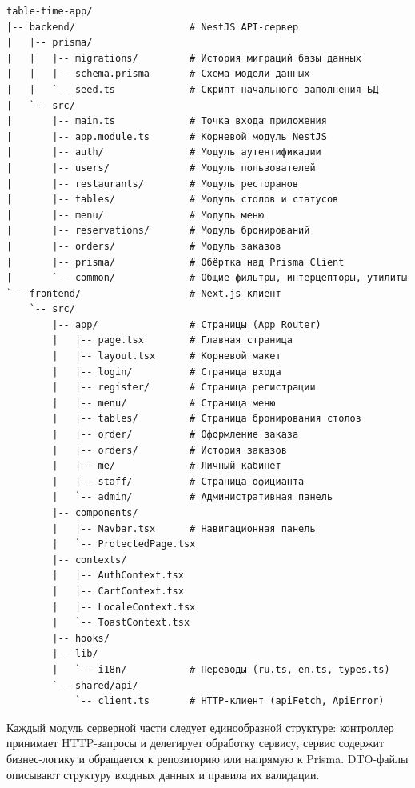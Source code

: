 \begin{lstlisting}[caption={Структура монорепозитория},
                   label=lst:dirtree]
table-time-app/
|-- backend/                    # NestJS API-сервер
|   |-- prisma/
|   |   |-- migrations/         # История миграций базы данных
|   |   |-- schema.prisma       # Схема модели данных
|   |   `-- seed.ts             # Скрипт начального заполнения БД
|   `-- src/
|       |-- main.ts             # Точка входа приложения
|       |-- app.module.ts       # Корневой модуль NestJS
|       |-- auth/               # Модуль аутентификации
|       |-- users/              # Модуль пользователей
|       |-- restaurants/        # Модуль ресторанов
|       |-- tables/             # Модуль столов и статусов
|       |-- menu/               # Модуль меню
|       |-- reservations/       # Модуль бронирований
|       |-- orders/             # Модуль заказов
|       |-- prisma/             # Обёртка над Prisma Client
|       `-- common/             # Общие фильтры, интерцепторы, утилиты
`-- frontend/                   # Next.js клиент
    `-- src/
        |-- app/                # Страницы (App Router)
        |   |-- page.tsx        # Главная страница
        |   |-- layout.tsx      # Корневой макет
        |   |-- login/          # Страница входа
        |   |-- register/       # Страница регистрации
        |   |-- menu/           # Страница меню
        |   |-- tables/         # Страница бронирования столов
        |   |-- order/          # Оформление заказа
        |   |-- orders/         # История заказов
        |   |-- me/             # Личный кабинет
        |   |-- staff/          # Страница официанта
        |   `-- admin/          # Административная панель
        |-- components/
        |   |-- Navbar.tsx      # Навигационная панель
        |   `-- ProtectedPage.tsx
        |-- contexts/
        |   |-- AuthContext.tsx
        |   |-- CartContext.tsx
        |   |-- LocaleContext.tsx
        |   `-- ToastContext.tsx
        |-- hooks/
        |-- lib/
        |   `-- i18n/           # Переводы (ru.ts, en.ts, types.ts)
        `-- shared/api/
            `-- client.ts       # HTTP-клиент (apiFetch, ApiError)
\end{lstlisting}

Каждый модуль серверной части следует единообразной структуре: контроллер
принимает HTTP-запросы и делегирует обработку сервису, сервис содержит
бизнес-логику и обращается к репозиторию или напрямую к Prisma.
DTO-файлы описывают структуру входных данных и правила их валидации.

